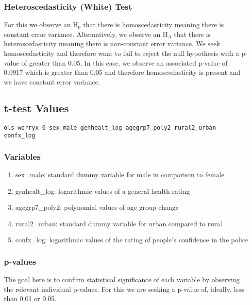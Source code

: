 \documentclass[11pt, english]{article}
\begin{document}
		\subsubsection{Heteroscedasticity (White) Test}

	For this we observe an H$_0$ that there is homoscedasticity meaning there is constant error variance. Alternatively, we observe an H$_A$ that there is heteroscedasticity meaning there is non-constant error variance. We seek homoscedasticity and therefore want to fail to reject the null hypothesis with a p-value of greater than 0.05. In this case, we observe an associated p-value of 0.0917 which is greater than 0.05 and therefore homoscedasticity is present and we have constant error variance.

	\newpage

	\subsection{t-test Values}

	\verb|ols worryx 0 sex_male genhealt_log agegrp7_poly2 rural2_urban confx_log|

		\subsubsection{Variables}

	\begin{enumerate}
	\setlength\itemsep{0cm}
		\item sex\_male: standard dummy variable for male in comparison to female
		\item genhealt\_log: logarithmic values of a general health rating
		\item agegrp7\_poly2: polynomial values of age group change
		\item rural2\_urban: standard dummy variable for urban compared to rural
		\item confx\_log: logarithmic values of the rating of people's confidence in the police
	\end{enumerate}

		\subsubsection{p-values}

	The goal here is to confirm statistical significance of each variable by observing the relevant individual p-values. For this we are seeking a p-value of, ideally, less than 0.01 or 0.05.\\
\end{document}

